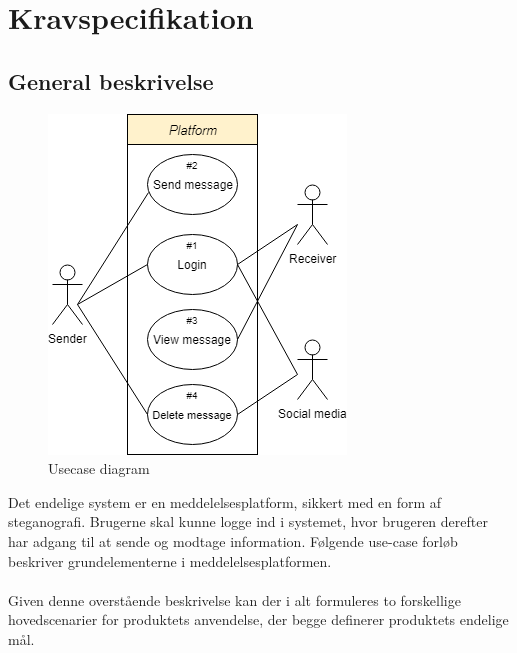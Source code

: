 \section{Kravspecifikation}

\subsection{General beskrivelse}
\begin{table}[H]
    \begin{minipage}{.6\textwidth}
        \begin{figure}[H]
            \centering
            \includegraphics[width=0.70\linewidth]{Projectdoc/Assets/Illustrationer/simple-usecase.png}
            \caption{Usecase diagram}
            \label{fig:usecase}
        \end{figure}
    \end{minipage}
    \begin{minipage}{.4\textwidth}
        Det endelige system er en meddelelsesplatform, sikkert med en form af steganografi. Brugerne skal kunne logge ind i systemet, hvor brugeren derefter har adgang til at sende og modtage information. Følgende use-case forløb beskriver grundelementerne i meddelelsesplatformen.
        \\\\
        Given denne overstående beskrivelse kan der i alt formuleres to forskellige hovedscenarier for produktets anvendelse, der begge definerer produktets endelige mål.
    \end{minipage}
\end{table}

